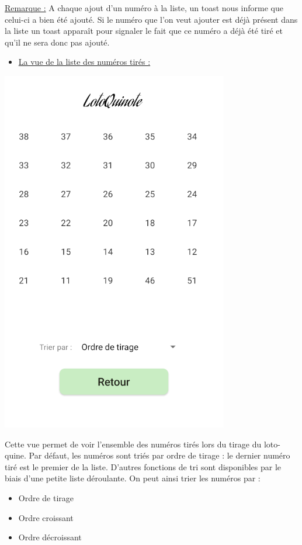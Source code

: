 \documentclass{article}
\begin{document}
\vspace{2em}
\newline
\underline{Remarque :}  A chaque ajout d'un numéro à la liste, un toast nous informe que celui-ci a bien été ajouté. Si le numéro que l'on veut ajouter est déjà présent dans la liste un toast apparaît pour signaler le fait que ce numéro a déjà été tiré et qu'il ne sera donc pas ajouté.
\newpage
\begin{itemize}
    \item {\underline{\large{La vue de la liste des numéros tirés :}}}
\end{itemize}
\vspace{1em}
    \begin{minipage}{.35\textwidth}%
        \includegraphics[scale=0.7]{liste.png}
    \end{minipage}%
    \hfill
    \begin{minipage}{.6\textwidth}%
    Cette vue permet de voir l'ensemble des numéros tirés lors du tirage du loto-quine. Par défaut, les numéros sont triés par ordre de tirage : le dernier numéro tiré est le premier de la liste.
    \vspace{1em}
    \newline
    D'autres fonctions de tri sont disponibles par le biais d'une petite liste déroulante. On peut ainsi trier les numéros par :
    \begin{itemize}
        \item Ordre de tirage
        \item Ordre croissant
        \item Ordre décroissant
    \end{itemize}
    \end{minipage}%
    
\end{document}
